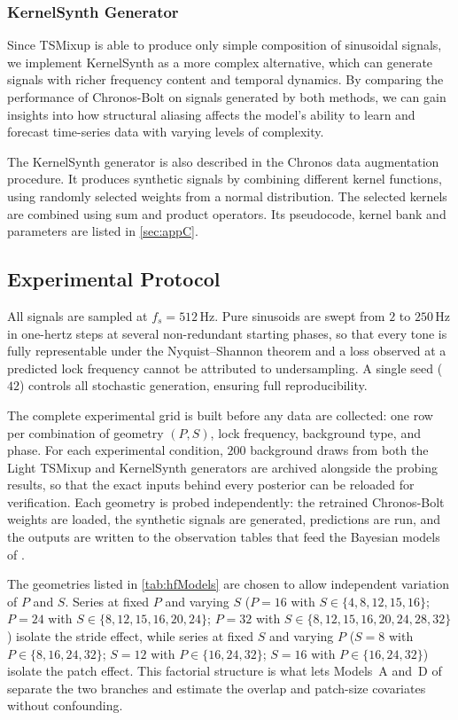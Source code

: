\subsubsection{KernelSynth Generator}
Since TSMixup is able to produce only simple composition of sinusoidal signals, we implement KernelSynth as a more complex alternative, which can generate signals with richer frequency content and temporal dynamics. By comparing the performance of Chronos-Bolt on signals generated by both methods, we can gain insights into how structural aliasing affects the model's ability to learn and forecast time-series data with varying levels of complexity.

The KernelSynth generator is also described in the Chronos data augmentation procedure.\cite{ansariChronosLearningLanguage2024} It produces synthetic signals by combining different kernel functions, using randomly selected weights from a normal distribution. The selected kernels are combined using sum and product operators. Its pseudocode, kernel bank and parameters are listed in \autoref{sec:appC}.

\subsection{Experimental Protocol}

All signals are sampled at $f_s = 512$\,Hz. Pure sinusoids are swept from $2$ to $250$\,Hz in one-hertz steps at several non-redundant starting phases, so that every tone is fully representable under the Nyquist--Shannon theorem and a loss observed at a predicted lock frequency cannot be attributed to undersampling. A single seed ($42$) controls all stochastic generation, ensuring full reproducibility.

The complete experimental grid is built before any data are collected: one row per combination of geometry $(P,S)$, lock frequency, background type, and phase. For each experimental condition, $200$ background draws from both the Light TSMixup and KernelSynth generators are archived alongside the probing results, so that the exact inputs behind every posterior can be reloaded for verification. Each geometry is probed independently: the retrained Chronos-Bolt weights are loaded, the synthetic signals are generated, predictions are run, and the outputs are written to the observation tables that feed the Bayesian models of .

The geometries listed in \autoref{tab:hfModels} are chosen to allow independent variation of $P$ and $S$. Series at fixed $P$ and varying $S$ ($P{=}16$ with $S\in\{4,8,12,15,16\}$; $P{=}24$ with $S\in\{8,12,15,16,20,24\}$; $P{=}32$ with $S\in\{8,12,15,16,20,24,28,32\}$) isolate the stride effect, while series at fixed $S$ and varying $P$ ($S{=}8$ with $P\in\{8,16,24,32\}$; $S{=}12$ with $P\in\{16,24,32\}$; $S{=}16$ with $P\in\{16,24,32\}$) isolate the patch effect. This factorial structure is what lets Models~A and~D of  separate the two branches and estimate the overlap and patch-size covariates without confounding.
